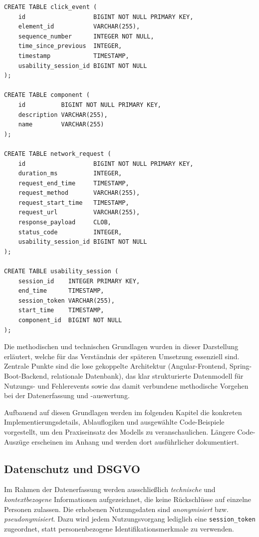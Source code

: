 \documentclass[12pt,oneside]{article}
\begin{document}
\lstset{style=sql}
\begin{lstlisting}
CREATE TABLE click_event (
    id                   BIGINT NOT NULL PRIMARY KEY,
    element_id           VARCHAR(255),
    sequence_number      INTEGER NOT NULL,
    time_since_previous  INTEGER,
    timestamp            TIMESTAMP,
    usability_session_id BIGINT NOT NULL
);

CREATE TABLE component (
    id          BIGINT NOT NULL PRIMARY KEY,
    description VARCHAR(255),
    name        VARCHAR(255)
);

CREATE TABLE network_request (
    id                   BIGINT NOT NULL PRIMARY KEY,
    duration_ms          INTEGER,
    request_end_time     TIMESTAMP,
    request_method       VARCHAR(255),
    request_start_time   TIMESTAMP,
    request_url          VARCHAR(255),
    response_payload     CLOB,
    status_code          INTEGER,
    usability_session_id BIGINT NOT NULL
);

CREATE TABLE usability_session (
    session_id    INTEGER PRIMARY KEY,
    end_time      TIMESTAMP,
    session_token VARCHAR(255),
    start_time    TIMESTAMP,
    component_id  BIGINT NOT NULL
);
\end{lstlisting}

 

Die methodischen und technischen Grundlagen wurden in dieser Darstellung erläutert, welche für das Verständnis der späteren Umsetzung essenziell sind. Zentrale Punkte sind die lose gekoppelte Architektur (Angular-Frontend, Spring-Boot-Backend, relationale Datenbank), das klar strukturierte Datenmodell für Nutzungs- und Fehlerevents sowie das damit verbundene methodische Vorgehen bei der Datenerfassung und -auswertung.

Aufbauend auf diesen Grundlagen werden im folgenden Kapitel die konkreten Implementierungsdetails, Ablauflogiken und ausgewählte Code-Beispiele vorgestellt, um den Praxiseinsatz des Modells zu veranschaulichen. Längere Code-Auszüge erscheinen im Anhang und werden dort ausführlicher dokumentiert.

 


\subsection{Datenschutz und DSGVO}
Im Rahmen der Datenerfassung werden ausschließlich \emph{technische} und \emph{kontextbezogene} Informationen aufgezeichnet, die keine Rückschlüsse auf einzelne Personen zulassen. Die erhobenen Nutzungsdaten sind \emph{anonymisiert} bzw. \emph{pseudonymisiert}. Dazu wird jedem Nutzungsvorgang lediglich eine \texttt{session\_token} zugeordnet, statt personenbezogene Identifikationsmerkmale zu verwenden.
\end{document}
